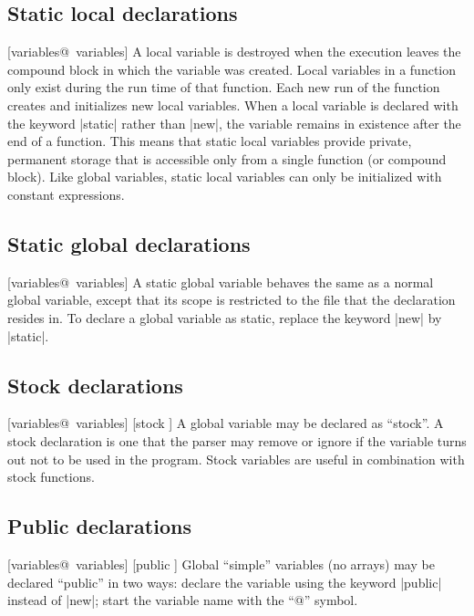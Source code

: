 \subsection{Static local declarations}
[variables@\midtilde\ variables]
A local variable is destroyed when the execution leaves the compound block in
which the variable was created. Local variables in a function only exist during
the run time of that function. Each new run of the function creates and
initializes new local variables. When a local variable is declared with
the keyword |static| rather than |new|, the variable remains in existence
after the end of a function. This means that static local variables provide
private, permanent storage that is accessible only from a single function
(or compound block). Like global variables, static local variables can only be
initialized with constant expressions.


\vfill\eject%
\subsection{Static global declarations}
[variables@\midtilde\ variables]
A static global variable behaves the same as a normal global variable, except
that its scope is restricted to the file that the declaration resides in. To
declare a global variable as static, replace the keyword |new| by |static|.


\subsection{Stock declarations}
 [variables@\midtilde\ variables] [stock \midtilde]
\noindent{}%
A global variable may be declared as ``stock''. A stock declaration is one that
the parser may remove or ignore if the variable turns out not to be used in the
program. Stock variables are useful in combination with stock functions.


\subsection{Public declarations}
 [variables@\midtilde\ variables] [public \midtilde]
Global ``simple'' variables (no arrays) may be declared ``public'' in two ways:
\beginlist{1em}\compactlist
\list{\lbullet}
  declare the variable using the keyword |public| instead of |new|;
\list{\lbullet}
  start the variable name with the ``@'' symbol.
\endlist

